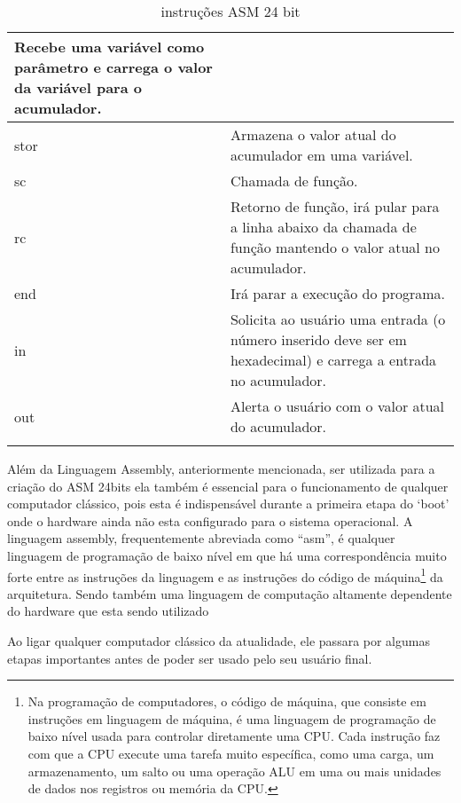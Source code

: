 \begin{longtable}{ |p{3cm}||p{11cm}|  }
  Recebe uma variável como parâmetro e carrega o valor da variável para o acumulador. \\
  \hline
  stor &
  Armazena o valor atual do acumulador em uma variável. \\
  \hline
  sc &
  Chamada de função. \\
  \hline
  rc &
  Retorno de função, irá pular para a linha abaixo da chamada de função mantendo o valor atual no acumulador. \\
  \hline
  end &
  Irá parar a execução do programa. \\
  \hline
  in &
  Solicita ao usuário uma entrada (o número inserido deve ser em hexadecimal) e carrega a entrada no acumulador. \\
  \hline
  out &
  Alerta o usuário com o valor atual do acumulador. \\
  \hline
  \caption{instruções ASM 24 bit}
  \label{table:2}
\end{longtable}
\vspace{1cm}

Além da Linguagem Assembly, anteriormente mencionada, ser utilizada para a criação do ASM 24bits ela também é essencial para o funcionamento de qualquer computador clássico, pois esta é indispensável durante a primeira etapa do `boot' onde o hardware ainda não esta configurado para o sistema operacional. A linguagem assembly, frequentemente abreviada como ``asm'', é qualquer linguagem de programação de baixo nível em que há uma correspondência muito forte entre as instruções da linguagem e as instruções do código de máquina\footnote{Na programação de computadores, o código de máquina, que consiste em instruções em linguagem de máquina, é uma linguagem de programação de baixo nível usada para controlar diretamente uma CPU. Cada instrução faz com que a CPU execute uma tarefa muito específica, como uma carga, um armazenamento, um salto ou uma operação ALU em uma ou mais unidades de dados nos registros ou memória da CPU.} da arquitetura. Sendo também uma linguagem de computação altamente dependente do hardware que esta sendo utilizado

Ao ligar qualquer computador clássico da atualidade, ele passara por algumas etapas importantes antes de poder ser usado pelo seu usuário final. 

